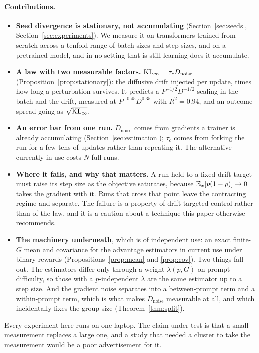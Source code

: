 \paragraph{Contributions.}
\begin{itemize}
  \item \textbf{Seed divergence is stationary, not accumulating} (Section~\ref{sec:seeds},
  Section~\ref{sec:experiments}). We measure it on transformers trained from scratch across a
  tenfold range of batch sizes and step sizes, and on a pretrained model, and in no setting that is
  still learning does it accumulate.

  \item \textbf{A law with two measurable factors.}
  $\mathrm{KL}_\infty = \tau_c D_{\mathrm{noise}}$ (Proposition~\ref{prop:stationary}): the diffusive drift
  injected per update, times how long a perturbation survives. It predicts a $P^{-1/2}D^{+1/2}$
  scaling in the batch and the drift, measured at $P^{-0.45}D^{0.35}$ with $R^2 = 0.94$, and an
  outcome spread going as $\sqrt{\mathrm{KL}_\infty}$.

  \item \textbf{An error bar from one run.} $D_{\mathrm{noise}}$ comes from gradients a trainer is
  already accumulating (Section~\ref{sec:estimation}); $\tau_c$ comes from forking the run for a few
  tens of updates rather than repeating it. The alternative currently in use costs $N$ full runs.

  \item \textbf{Where it fails, and why that matters.} A run held to a fixed drift target must raise
  its step size as the objective saturates, because $\mathbb{E}_x[p(1-p)] \to 0$ takes the gradient with it.
  Runs that cross that point leave the contracting regime and separate. The failure is a property of
  drift-targeted control rather than of the law, and it is a caution about a technique this paper
  otherwise recommends.

  \item \textbf{The machinery underneath}, which is of independent use: an exact finite-$G$ mean and
  covariance for the advantage estimators in current use under binary rewards
  (Propositions~\ref{prop:mean} and \ref{prop:cov}). Two things fall out. The estimators differ only
  through a weight $\lambda(p,G)$ on prompt difficulty, so those with a $p$-independent $\lambda$ are
  the same estimator up to a step size. And the gradient noise separates into a between-prompt term
  and a within-prompt term, which is what makes $D_{\mathrm{noise}}$ measurable at all, and which
  incidentally fixes the group size (Theorem~\ref{thm:split}).
\end{itemize}

Every experiment here runs on one laptop. The claim under test is that a small measurement replaces
a large one, and a study that needed a cluster to take the measurement would be a poor advertisement
for it.
